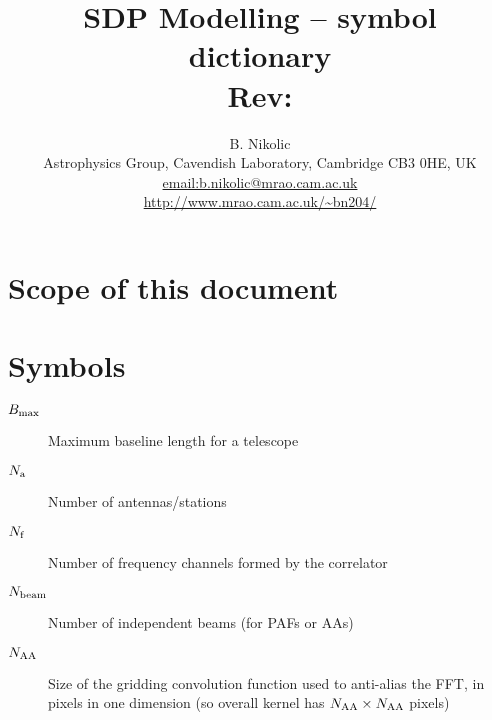 \documentclass[useAMS,usenatbib,referee]{article}
\title{SDP Modelling -- symbol dictionary\\
  Rev: }
\author{B. Nikolic\\
  Astrophysics Group, Cavendish Laboratory, Cambridge CB3 0HE, UK
  \\\url{email:b.nikolic@mrao.cam.ac.uk}
 \\\url{http://www.mrao.cam.ac.uk/~bn204/}}
\begin{document}
\maketitle

\tableofcontents

\section{Scope of this document}

\section{Symbols}

\begin{description}
  \item[$B_{\rm max}$] Maximum baseline length for a telescope
  \item[$N_{\rm a}$] Number of antennas/stations
  \item[$N_{\rm f}$] Number of frequency channels formed by the
    correlator
  \item[$N_{\rm beam}$] Number of independent beams (for PAFs or AAs)
  \item[$N_{\rm AA}$] Size of the gridding convolution function used
    to anti-alias the FFT, in pixels in one dimension (so overall
    kernel has $N_{\rm AA} \times N_{\rm AA}$ pixels)
\end{description}
\end{document}
